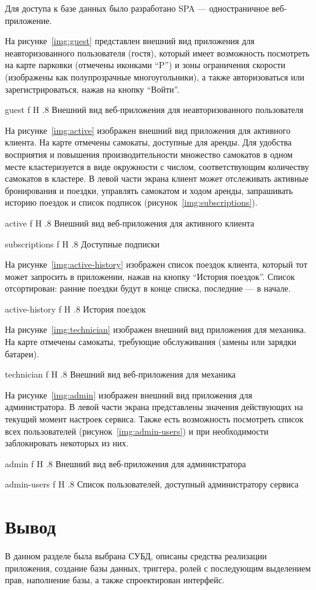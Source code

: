 Для доступа к базе данных было разработано SPA --- одностраничное веб-приложение.

На рисунке~\ref{img:guest} представлен внешний вид приложения для неавторизованного пользователя (гостя), который имеет возможность посмотреть на карте парковки (отмечены иконками \enquote{P}) и зоны ограничения скорости (изображены как полупрозрачные многоугольники), а также авторизоваться или зарегистрироваться, нажав на кнопку \enquote{Войти}.

{guest}
{f}
{H}
{.8\textwidth}
{Внешний вид веб-приложения для неавторизованного пользователя}

На рисунке~\ref{img:active} изображен внешний вид приложения для активного клиента. На карте отмечены самокаты, доступные для аренды. Для удобства восприятия и повышения производительности множество самокатов в одном месте кластеризуется в виде окружности с числом, соответствующим количеству самокатов в кластере. В левой части экрана клиент может отслеживать активные бронирования и поездки, управлять самокатом и ходом аренды, запрашивать историю поездок и список подписок (рисунок~\ref{img:subscriptions}).

{active}
{f}
{H}
{.8\textwidth}
{Внешний вид веб-приложения для активного клиента}

{subscriptions}
{f}
{H}
{.8\textwidth}
{Доступные подписки}

На рисунке~\ref{img:active-history} изображен список поездок клиента, который тот может запросить в приложении, нажав на кнопку \enquote{История поездок}. Список отсортирован: ранние поездки будут в конце списка, последние --- в начале.

{active-history}
{f}
{H}
{.8\textwidth}
{История поездок}

На рисунке~\ref{img:technician} изображен внешний вид приложения для механика. На карте отмечены самокаты, требующие обслуживания (замены или зарядки батареи).

{technician}
{f}
{H}
{.8\textwidth}
{Внешний вид веб-приложения для механика}

На рисунке~\ref{img:admin} изображен внешний вид приложения для администратора. В левой части экрана представлены значения действующих на текущий момент настроек сервиса. Также есть возможность посмотреть список всех пользователей (рисунок~\ref{img:admin-users}) и при необходимости заблокировать некоторых из них.

{admin}
{f}
{H}
{.8\textwidth}
{Внешний вид веб-приложения для администратора}

{admin-users}
{f}
{H}
{.8\textwidth}
{Список пользователей, доступный администратору сервиса}

\section*{Вывод}

В данном разделе была выбрана СУБД, описаны средства реализации приложения, создание базы данных, триггера, ролей с последующим выделением прав, наполнение базы, а также спроектирован интерфейс.